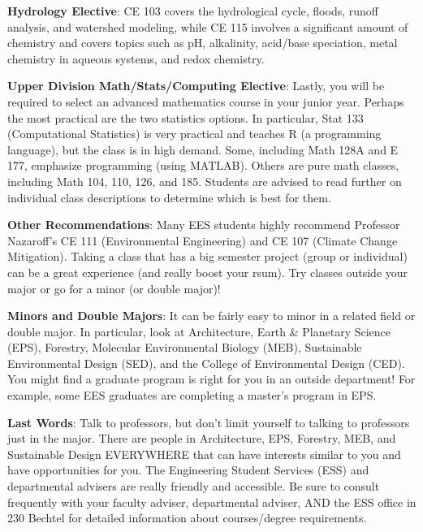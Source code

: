 \textbf{Hydrology Elective}: CE 103 covers the hydrological cycle, floods, runoff analysis, and watershed modeling, while CE 115 involves a significant amount of chemistry and covers topics such as pH, alkalinity, acid/base speciation, metal chemistry in aqueous systems, and redox chemistry.

\textbf{Upper Division Math/Stats/Computing Elective}: Lastly, you will be required to select an advanced mathematics course in your junior year. Perhaps the most practical are the two statistics options. In particular, Stat 133 (Computational Statistics) is very practical and teaches R (a programming language), but the class is in high demand. Some, including Math 128A and E 177, emphasize programming (using MATLAB). Others are pure math classes, including Math 104, 110, 126, and 185. Students are advised to read further on individual class descriptions to determine which is best for them.

\textbf{Other Recommendations}: Many EES students highly recommend Professor Nazaroff’s CE 111 (Environmental Engineering) and CE 107 (Climate Change Mitigation). Taking a class that has a big semester project (group or individual) can be a great experience (and really boost your rsum). Try classes outside your major or go for a minor (or double major)!

\textbf{Minors and Double Majors}: It can be fairly easy to minor in a related field or double major. In particular, look at Architecture, Earth \& Planetary Science (EPS), Forestry, Molecular Environmental Biology (MEB), Sustainable Environmental Design (SED), and the College of Environmental Design (CED). You might find a graduate program is right for you in an outside department! For example, some EES graduates are completing a master’s program in EPS.

\textbf{Last Words}: Talk to professors, but don’t limit yourself to talking to professors just in the major. There are people in Architecture, EPS, Forestry, MEB, and Sustainable Design EVERYWHERE that can have interests similar to you and have opportunities for you. The Engineering Student Services (ESS) and departmental advisers are really friendly and accessible. Be sure to consult frequently with your faculty adviser, departmental adviser, AND the ESS office in 230 Bechtel for detailed information about courses/degree requirements.

